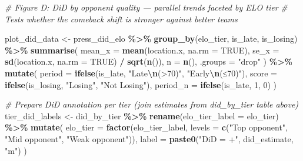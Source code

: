 \documentclass[
]{article}
\newenvironment{Shaded}{\begin{snugshade}}{\end{snugshade}}
\newcommand{\AttributeTok}[1]{\textcolor[rgb]{0.13,0.29,0.53}{#1}}
\newcommand{\CommentTok}[1]{\textcolor[rgb]{0.56,0.35,0.01}{\textit{#1}}}
\newcommand{\ConstantTok}[1]{\textcolor[rgb]{0.56,0.35,0.01}{#1}}
\newcommand{\DecValTok}[1]{\textcolor[rgb]{0.00,0.00,0.81}{#1}}
\newcommand{\FunctionTok}[1]{\textcolor[rgb]{0.13,0.29,0.53}{\textbf{#1}}}
\newcommand{\NormalTok}[1]{#1}
\newcommand{\OtherTok}[1]{\textcolor[rgb]{0.56,0.35,0.01}{#1}}
\newcommand{\SpecialCharTok}[1]{\textcolor[rgb]{0.81,0.36,0.00}{\textbf{#1}}}
\newcommand{\StringTok}[1]{\textcolor[rgb]{0.31,0.60,0.02}{#1}}
\begin{document}
\begin{Shaded}
\begin{Highlighting}[]
\CommentTok{\# Figure D: DiD by opponent quality — parallel trends faceted by ELO tier}
\CommentTok{\# Tests whether the comeback shift is stronger against better teams}

\NormalTok{plot\_did\_data }\OtherTok{\textless{}{-}}\NormalTok{ press\_did\_elo }\SpecialCharTok{\%\textgreater{}\%}
  \FunctionTok{group\_by}\NormalTok{(elo\_tier, is\_late, is\_losing) }\SpecialCharTok{\%\textgreater{}\%}
  \FunctionTok{summarise}\NormalTok{(}
    \AttributeTok{mean\_x =} \FunctionTok{mean}\NormalTok{(location.x, }\AttributeTok{na.rm =} \ConstantTok{TRUE}\NormalTok{),}
    \AttributeTok{se\_x   =} \FunctionTok{sd}\NormalTok{(location.x,   }\AttributeTok{na.rm =} \ConstantTok{TRUE}\NormalTok{) }\SpecialCharTok{/} \FunctionTok{sqrt}\NormalTok{(}\FunctionTok{n}\NormalTok{()),}
    \AttributeTok{n      =} \FunctionTok{n}\NormalTok{(),}
    \AttributeTok{.groups =} \StringTok{"drop"}
\NormalTok{  ) }\SpecialCharTok{\%\textgreater{}\%}
  \FunctionTok{mutate}\NormalTok{(}
    \AttributeTok{period   =} \FunctionTok{ifelse}\NormalTok{(is\_late,   }\StringTok{"Late}\SpecialCharTok{\textbackslash{}n}\StringTok{(\textgreater{}70\textquotesingle{})"}\NormalTok{, }\StringTok{"Early}\SpecialCharTok{\textbackslash{}n}\StringTok{(≤70\textquotesingle{})"}\NormalTok{),}
    \AttributeTok{score    =} \FunctionTok{ifelse}\NormalTok{(is\_losing, }\StringTok{"Losing"}\NormalTok{,       }\StringTok{"Not Losing"}\NormalTok{),}
    \AttributeTok{period\_n =} \FunctionTok{ifelse}\NormalTok{(is\_late, }\DecValTok{1}\NormalTok{, }\DecValTok{0}\NormalTok{)}
\NormalTok{  )}

\CommentTok{\# Prepare DiD annotation per tier (join estimates from did\_by\_tier table above)}
\NormalTok{tier\_did\_labels }\OtherTok{\textless{}{-}}\NormalTok{ did\_by\_tier }\SpecialCharTok{\%\textgreater{}\%}
  \FunctionTok{rename}\NormalTok{(}\AttributeTok{elo\_tier\_label =}\NormalTok{ elo\_tier) }\SpecialCharTok{\%\textgreater{}\%}
  \FunctionTok{mutate}\NormalTok{(}
    \AttributeTok{elo\_tier =} \FunctionTok{factor}\NormalTok{(elo\_tier\_label,}
                      \AttributeTok{levels =} \FunctionTok{c}\NormalTok{(}\StringTok{"Top opponent"}\NormalTok{, }\StringTok{"Mid opponent"}\NormalTok{, }\StringTok{"Weak opponent"}\NormalTok{)),}
    \AttributeTok{label    =} \FunctionTok{paste0}\NormalTok{(}\StringTok{"DiD = +"}\NormalTok{, did\_estimate, }\StringTok{"m"}\NormalTok{)}
\NormalTok{  )}


\end{Highlighting}
\end{Shaded}
\end{document}
